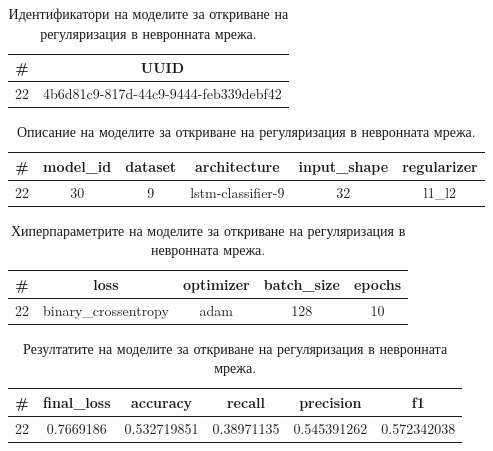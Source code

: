 \documentclass{article}
\begin{document}
\begin{table}[H]
\centering
\captionsetup{justification=centering}
\begin{tabular}{|c||c|}
\hline
\# & UUID\\
\hline
22 & 4b6d81c9-817d-44c9-9444-feb339debf42\\
\hline
\end{tabular}
\caption{Идентификатори на моделите за откриване на регуляризация в невронната мрежа.}
\end{table}

\begin{table}[H]
\centering
\captionsetup{justification=centering}
\begin{tabular}{|c||c|c|c|c|c|}
\hline
\# & model\_id & dataset & architecture & input\_shape & regularizer\\
\hline
22 & 30 & 9 & lstm-classifier-9 & 32 & l1\_l2\\
\hline
\end{tabular}
\caption{Описание на моделите за откриване на регуляризация в невронната мрежа.}
\end{table}

\begin{table}[H]
\centering
\captionsetup{justification=centering}
\begin{tabular}{|c||c|c|c|c|}
\hline
\# & loss & optimizer & batch\_size & epochs\\
\hline
22 & binary\_crossentropy & adam & 128 & 10\\
\hline
\end{tabular}
\caption{Хиперпараметрите на моделите за откриване на регуляризация в невронната мрежа.}
\end{table}

\begin{table}[H]
\centering
\captionsetup{justification=centering}
\begin{tabular}{|c||c|c|c|c|c|}
\hline
\# & final\_loss & accuracy & recall & precision & f1\\
\hline
22 & 0.7669186 & 0.532719851 & 0.38971135 & 0.545391262 & 0.572342038\\
\hline
\end{tabular}
\caption{Резултатите на моделите за откриване на регуляризация в невронната мрежа.}
\end{table}
\end{document}

